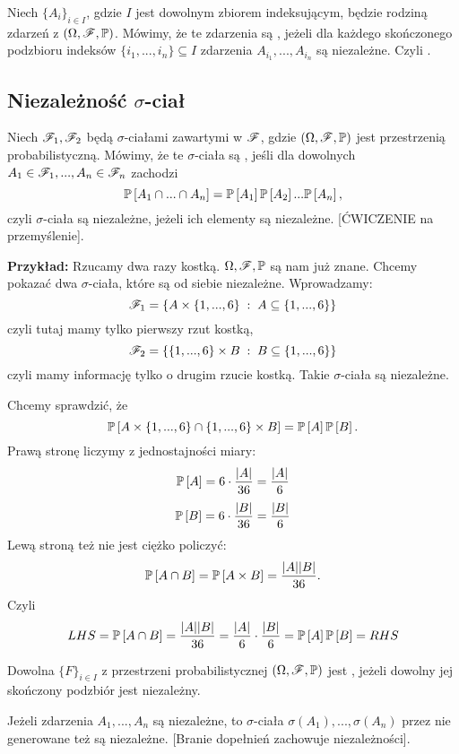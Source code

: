 Niech $\{A_i\}_{i\in I}$, gdzie $I$ jest dowolnym zbiorem indeksującym, będzie rodziną zdarzeń z $(\Omega,\mathcal{F}, \mathbb{P})$. Mówimy, że te zdarzenia są , jeżeli dla każdego skończonego podzbioru indeksów $\{i_1,...,i_n\}\subseteq I$ zdarzenia $A_{i_1},...,A_{i_n}$ są niezależne. Czyli .

\subsection{Niezależność $\sigma$-ciał}

Niech $\mathcal{F}_1, \mathcal{F}_2$ będą $\sigma$-ciałami zawartymi w $\mathcal{F}$, gdzie $(\Omega, \mathcal{F}, \mathbb{P})$ jest przestrzenią probabilistyczną. Mówimy, że te $\sigma$-ciała są , jeśli dla dowolnych $A_1\in\mathcal{F}_1,...,A_n\in\mathcal{F}_n$ zachodzi
$$\mathbb{P}\left[A_1\cap...\cap A_n\right]=\mathbb{P}\left[A_1\right]\mathbb{P}\left[A_2\right]...\mathbb{P}\left[A_n\right],$$
czyli $\sigma$-ciała są niezależne, jeżeli ich elementy są niezależne. [{\color{orange}ĆWICZENIE na przemyślenie}].
\medskip

\textbf{Przykład:} Rzucamy dwa razy kostką. $\Omega,\mathcal{F},\mathbb{P}$ są nam już znane. Chcemy pokazać dwa $\sigma$-ciała, które są od siebie niezależne. Wprowadzamy:
$$\mathcal{F}_1=\{A\times\{1,...,6\}\;:\;A\subseteq\{1,...,6\}\}$$
czyli tutaj mamy tylko pierwszy rzut kostką,
$$\mathcal{F}_2=\{\{1,...,6\}\times B\;:\;B\subseteq\{1,...,6\}\}$$
czyli mamy informację tylko o drugim rzucie kostką. Takie $\sigma$-ciała są niezależne.

Chcemy sprawdzić, że 
$$\mathbb{P}\left[A\times\{1,...,6\}\cap\{1,...,6\}\times B\right]=\mathbb{P}\left[A\right]\mathbb{P}\left[B\right].$$
Prawą stronę liczymy z jednostajności miary:
$$\mathbb{P}\left[A\right]=6\cdot{|A|\over 36}={|A|\over 6}$$
$$\mathbb{P}\left[B\right]=6\cdot{|B|\over36}={|B|\over 6}$$
Lewą stroną też nie jest ciężko policzyć:
$$\mathbb{P}\left[A\cap B\right]=\mathbb{P}\left[A\times B\right]={|A||B|\over 36}.$$
Czyli 
$$LHS=\mathbb{P}\left[A\cap B\right]={|A||B|\over 36}={|A|\over 6}\cdot{|B|\over 6}=\mathbb{P}\left[A\right]\mathbb{P}\left[B\right]=RHS$$

Dowolna  $\{F\}_{i\in I}$ z przestrzeni probabilistycznej $(\Omega,\mathcal{F},\mathbb{P})$ jest , jeżeli dowolny jej skończony podzbiór jest niezależny.
\medskip

 Jeżeli zdarzenia $A_1,...,A_n$ są niezależne, to $\sigma$-ciała $\sigma(A_1),...,\sigma(A_n)$ przez nie generowane też są niezależne. [Branie dopełnień zachowuje niezależności].

